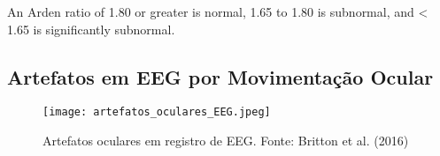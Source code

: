  An Arden ratio of 1.80 or greater is normal, 1.65 to 1.80 is subnormal, and < 1.65 is significantly subnormal.
  
  
  \subsection{Artefatos em EEG por Movimentação Ocular}

  \begin{figure}[h]
    \centering
    \texttt{[image: artefatos\_oculares\_EEG.jpeg]}
    \caption[]{Artefatos oculares em registro de EEG. Fonte: Britton et al. (2016)}\label{fig:}
    \end{figure}

